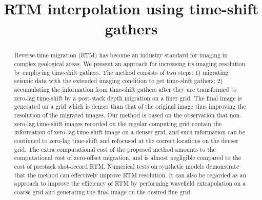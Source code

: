 \renewcommand{\thefootnote}{\fnsymbol{footnote}}
\title{RTM interpolation using time-shift gathers}
\relax{}

\maketitle

\begin{abstract}
	Reverse-time migration (RTM) has become an industry standard for imaging in complex geological areas.
	We present an approach for increasing its imaging resolution by employing time-shift gathers.
	The method consists of two steps: 1) migrating seismic data with the extended imaging condition to get time-shift gathers;
	2) accumulating the information from time-shift gathers
	after they are transformed to zero-lag time-shift by a post-stack depth migration on a finer grid.
	The final image is generated on a grid which is denser than that of the original image thus improving the resolution of the migrated images.
	Our method is based on the observation that non-zero-lag time-shift images recorded on the regular computing grid
	contain the information of zero-lag time-shift image on a denser grid, and such information
	can be continued to zero-lag time-shift and refocused at the correct locations on the denser grid.
	The extra computational cost of the proposed method amounts to the computational cost of zero-offset migration,
	and is almost negligible compared to the cost of prestack shot-record RTM.
	Numerical tests on synthetic models demonstrate that the method can effectively improve RTM resolution.
	It can also be regarded as an approach to improve the efficiency of RTM by performing wavefield extrapolation on a coarse grid and generating 
	the final image on the desired fine grid.
\end{abstract}

